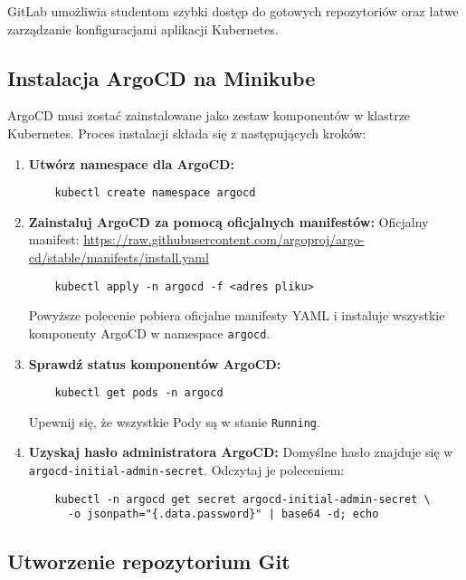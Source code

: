 \documentclass{article}
\begin{document}
GitLab umożliwia studentom szybki dostęp do gotowych repozytoriów oraz łatwe zarządzanie konfiguracjami aplikacji Kubernetes.

\subsection{Instalacja ArgoCD na Minikube}

ArgoCD musi zostać zainstalowane jako zestaw komponentów w klastrze Kubernetes. Proces instalacji składa się z następujących kroków:

\begin{enumerate}
    \item \textbf{Utwórz namespace dla ArgoCD:}
    \begin{lstlisting}
    kubectl create namespace argocd
    \end{lstlisting}

    \item \textbf{Zainstaluj ArgoCD za pomocą oficjalnych manifestów:}
    Oficjalny manifest: \url{https://raw.githubusercontent.com/argoproj/argo-cd/stable/manifests/install.yaml}
    \begin{lstlisting}
    kubectl apply -n argocd -f <adres pliku>
    \end{lstlisting}
    Powyższe polecenie pobiera oficjalne manifesty YAML i instaluje wszystkie komponenty ArgoCD w namespace \texttt{argocd}.

    \item \textbf{Sprawdź status komponentów ArgoCD:}
    \begin{lstlisting}
    kubectl get pods -n argocd
    \end{lstlisting}
    Upewnij się, że wszystkie Pody są w stanie \texttt{Running}.

    \item \textbf{Uzyskaj hasło administratora ArgoCD:}
    Domyślne hasło znajduje się w \texttt{argocd-initial-admin-secret}. Odczytaj je poleceniem:
    \begin{lstlisting}
    kubectl -n argocd get secret argocd-initial-admin-secret \
      -o jsonpath="{.data.password}" | base64 -d; echo
    \end{lstlisting}
\end{enumerate}

\subsection{Utworzenie repozytorium Git}
\end{document}
